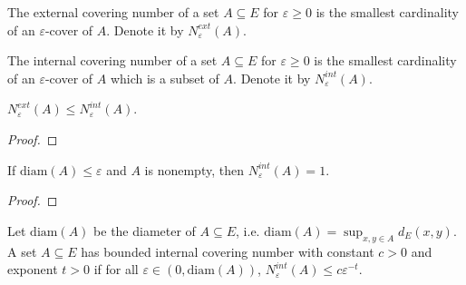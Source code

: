 \begin{definition}\label{def:externalCoveringNumber}
  \leanok
  The external covering number of a set $A \subseteq E$ for $\varepsilon \ge 0$ is the smallest cardinality of an $\varepsilon$-cover of $A$.
  Denote it by $N^{ext}_\varepsilon(A)$.
\end{definition}


\begin{definition}\label{def:internalCoveringNumber}
  \leanok
  The internal covering number of a set $A \subseteq E$ for $\varepsilon \ge 0$ is the smallest cardinality of an $\varepsilon$-cover of $A$ which is a subset of $A$.
  Denote it by $N^{int}_\varepsilon(A)$.
\end{definition}


\begin{lemma}\label{lem:externalCoveringNumber_le_internalCoveringNumber}
  \leanok
$N^{ext}_\varepsilon(A) \le N^{int}_\varepsilon(A)$.
\end{lemma}

\begin{proof}\leanok

\end{proof}


\begin{lemma}\label{lem:internalCoveringNumber_eq_one_of_diam_le}
  \leanok
If $\mathrm{diam}(A) \le \varepsilon$ and $A$ is nonempty, then $N^{int}_\varepsilon(A) = 1$.
\end{lemma}

\begin{proof}

\end{proof}


\begin{definition}\label{def:HasBoundedInternalCoveringNumber}
  \leanok
  Let $\mathrm{diam}(A)$ be the diameter of $A \subseteq E$, i.e. $\mathrm{diam}(A) = \sup_{x,y \in A} d_E(x, y)$.
  A set $A \subseteq E$ has bounded internal covering number with constant $c>0$ and exponent $t>0$ if for all $\varepsilon \in (0, \mathrm{diam}(A))$, $N^{int}_\varepsilon(A) \le c \varepsilon^{-t}$.
\end{definition}


